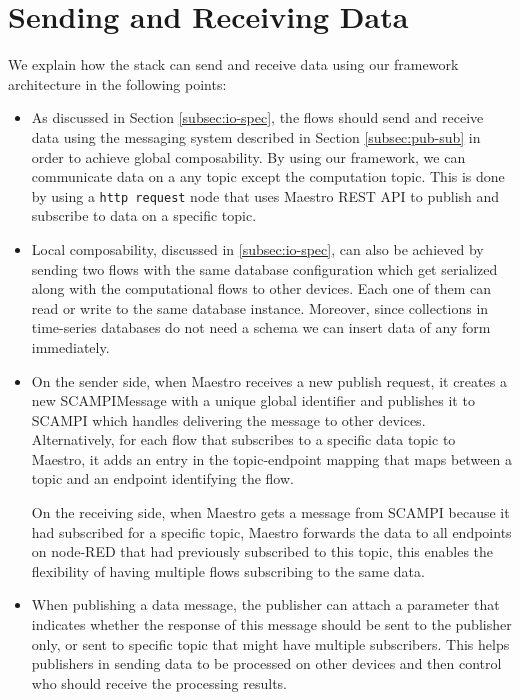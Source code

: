 \section{Sending and Receiving Data}

We explain how the stack can send and receive data using our framework architecture in the following points:
\begin{itemize}
\item As discussed in Section \ref{subsec:io-spec}, the flows should send and receive data using the messaging system described in Section \ref{subsec:pub-sub} in order to achieve global composability. By using our framework, we can communicate data on a any topic except the computation topic. This is done  by using a \verb|http request| node that uses Maestro REST API to publish and subscribe to data on a specific topic.\\

\item Local composability, discussed in  \ref{subsec:io-spec}, can also be achieved by sending two flows with the same database configuration which get serialized along with the computational flows to other devices. Each one of them can read or write to the same database instance. Moreover, since collections in time-series databases do not need a schema we can insert  data of any form immediately. 

\item On the sender side, when Maestro receives a new publish request, it creates a new SCAMPIMessage with a unique global identifier and publishes it to SCAMPI which handles delivering the message to other devices. Alternatively, for each flow that subscribes to a specific data topic to Maestro, it  adds an entry in the topic-endpoint mapping that maps between a topic and an endpoint identifying the flow. 

On the receiving side, when Maestro gets a message from SCAMPI because it had subscribed for a specific topic, Maestro forwards the data to all endpoints on node-RED that had previously subscribed to this topic, this enables the flexibility of having multiple flows subscribing to the same data.\\


\item When  publishing a data message, the publisher can attach a parameter that indicates whether the response of this message should be sent to the publisher only, or sent to specific topic that might have multiple subscribers. This helps publishers in sending data to be processed on other devices and then control who should receive the processing results.\\



\end{itemize}
